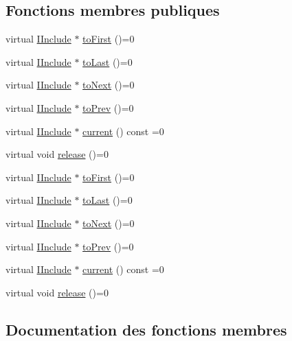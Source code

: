 \subsection*{Fonctions membres publiques}
\begin{DoxyCompactItemize}
\item 
virtual \hyperlink{class_i_include}{I\+Include} $\ast$ \hyperlink{class_i_include_iterator_a256ba113c12685f8e32937356c95e85a}{to\+First} ()=0
\item 
virtual \hyperlink{class_i_include}{I\+Include} $\ast$ \hyperlink{class_i_include_iterator_aaea0d5fbcf3359949b998926ef9c9664}{to\+Last} ()=0
\item 
virtual \hyperlink{class_i_include}{I\+Include} $\ast$ \hyperlink{class_i_include_iterator_aae44ab10d11314b96cb85e3f379b1dc8}{to\+Next} ()=0
\item 
virtual \hyperlink{class_i_include}{I\+Include} $\ast$ \hyperlink{class_i_include_iterator_a090fd6435c480714efe41c2719bb7f7c}{to\+Prev} ()=0
\item 
virtual \hyperlink{class_i_include}{I\+Include} $\ast$ \hyperlink{class_i_include_iterator_a2ed9b62d43948544b8b4ce8ee60a8442}{current} () const  =0
\item 
virtual void \hyperlink{class_i_include_iterator_a365e63926f161a3e2064cc86152c0329}{release} ()=0
\item 
virtual \hyperlink{class_i_include}{I\+Include} $\ast$ \hyperlink{class_i_include_iterator_a256ba113c12685f8e32937356c95e85a}{to\+First} ()=0
\item 
virtual \hyperlink{class_i_include}{I\+Include} $\ast$ \hyperlink{class_i_include_iterator_aaea0d5fbcf3359949b998926ef9c9664}{to\+Last} ()=0
\item 
virtual \hyperlink{class_i_include}{I\+Include} $\ast$ \hyperlink{class_i_include_iterator_aae44ab10d11314b96cb85e3f379b1dc8}{to\+Next} ()=0
\item 
virtual \hyperlink{class_i_include}{I\+Include} $\ast$ \hyperlink{class_i_include_iterator_a090fd6435c480714efe41c2719bb7f7c}{to\+Prev} ()=0
\item 
virtual \hyperlink{class_i_include}{I\+Include} $\ast$ \hyperlink{class_i_include_iterator_a2ed9b62d43948544b8b4ce8ee60a8442}{current} () const  =0
\item 
virtual void \hyperlink{class_i_include_iterator_a365e63926f161a3e2064cc86152c0329}{release} ()=0
\end{DoxyCompactItemize}


\subsection{Documentation des fonctions membres}
\hypertarget{class_i_include_iterator_a2ed9b62d43948544b8b4ce8ee60a8442}{}
